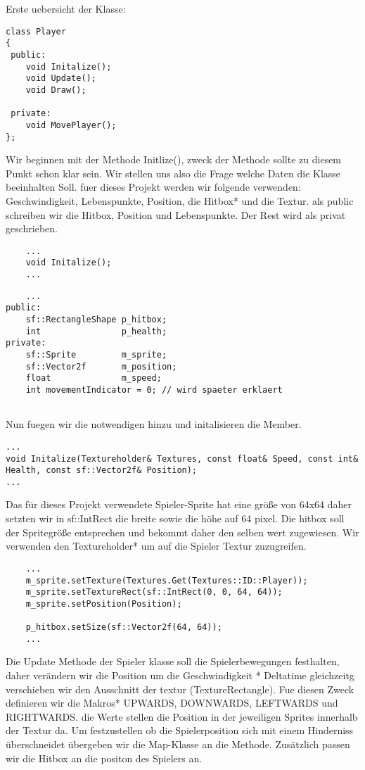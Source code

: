 Erste uebersicht der Klasse: 
\begin{lstlisting}
class Player
{
 public:
	void Initalize();
	void Update();
	void Draw();
	
 private:
	void MovePlayer();
};
\end{lstlisting}

Wir beginnen mit der Methode Initlize(), zweck der Methode sollte zu diesem Punkt schon klar sein. Wir stellen uns also die Frage welche Daten die Klasse beeinhalten Soll. 
fuer dieses Projekt werden wir folgende verwenden: Geschwindigkeit, Lebenspunkte, Position, die Hitbox* und die Textur. als public schreiben wir die Hitbox, Position und Lebenspunkte. Der Rest wird als privat geschrieben. 

\begin{lstlisting}
	...
	void Initalize();
	...
\end{lstlisting}

\begin{lstlisting}
	...
public:
	sf::RectangleShape p_hitbox;
	int				   p_health;
private:
	sf::Sprite		   m_sprite;
	sf::Vector2f	   m_position;
	float			   m_speed;
	int movementIndicator = 0; // wird spaeter erklaert 
	
\end{lstlisting}

Nun fuegen wir die notwendigen hinzu und initalisieren die Member. 

\begin{lstlisting}
...
void Initalize(Textureholder& Textures, const float& Speed, const int& Health, const sf::Vector2f& Position);
...
\end{lstlisting}

Das für dieses Projekt verwendete Spieler-Sprite hat eine größe von 64x64 daher setzten wir in sf::IntRect die breite sowie die höhe auf 64 pixel. Die hitbox soll der Spritegröße entsprechen und bekommt daher den selben wert zugewiesen. Wir verwenden den Textureholder* um auf die Spieler Textur zuzugreifen. 

\begin{lstlisting}
	...
	m_sprite.setTexture(Textures.Get(Textures::ID::Player));
	m_sprite.setTextureRect(sf::IntRect(0, 0, 64, 64));
	m_sprite.setPosition(Position);
	
	p_hitbox.setSize(sf::Vector2f(64, 64));
	...
\end{lstlisting}

Die Update Methode der Spieler klasse soll die Spielerbewegungen festhalten, daher verändern wir die Position um die Geschwindigkeit * Deltatime gleichzeitg verschieben wir den Ausschnitt der textur (TextureRectangle). Fue diesen Zweck definieren wir die Makros* UPWARDS, DOWNWARDS, LEFTWARDS und RIGHTWARDS. die Werte stellen die Position in der jeweiligen Sprites innerhalb der Textur da. Um festzustellen ob die Spielerposition sich mit einem Hinderniss überschneidet übergeben wir die Map-Klasse an die Methode. Zusätzlich passen wir die Hitbox an die positon des Spielers an. 


